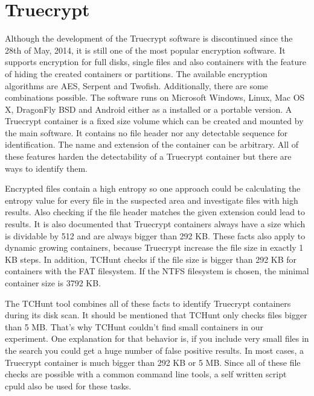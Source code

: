 \section{Truecrypt}
Although the development of the Truecrypt software is discontinued since the 28th of May, 2014, it is still one of the most popular encryption software.
It supports encryption for full disks, single files and also containers with the feature of hiding the created containers or partitions.
The available encryption algorithms are AES, Serpent and Twofish. Additionally, there are some combinations possible.
The software runs on Microsoft Windows, Linux, Mac OS X, DragonFly BSD and Android either as a installed or a portable version.\cite{wiki:Truecrypt}
A Truecrypt container is a fixed size volume which can be created and mounted by the main software.
It contains no file header nor any detectable sequence for identification.
The name and extension of the container can be arbitrary.
All of these features harden the detectability of a Truecrypt container but there are ways to identify them.

Encrypted files contain a high entropy so one approach could be calculating the entropy value for every file in the suspected area and investigate files with high results.
Also checking if the file header matches the given extension could lead to results.
It is also documented that Truecrypt containers always have a size which is dividable by 512 and are always bigger than 292 KB.
These facts also apply to dynamic growing containers, because Truecrypt increase the file size in exactly 1 KB steps. 
In addition, TCHunt checks if the file size is bigger than 292 KB for containers with the FAT filesystem. 
If the NTFS filesystem is chosen, the minimal container size is 3792 KB.
\cite{Truecrypt:sourceCode}

The TCHunt tool combines all of these facts to identify Truecrypt containers during its disk scan. 
It should be mentioned that TCHunt only checks files bigger than 5 MB.
That's why TCHunt couldn't find small containers in our experiment. 
One explanation for that behavior is, if you include very small files in the search you could get a huge number of false positive results. 
In most cases, a Truecrypt container is much bigger than 292 KB or 5 MB. 
Since all of these file checks are possible with a common command line tools, a self written script cpuld also be used for these tasks.
